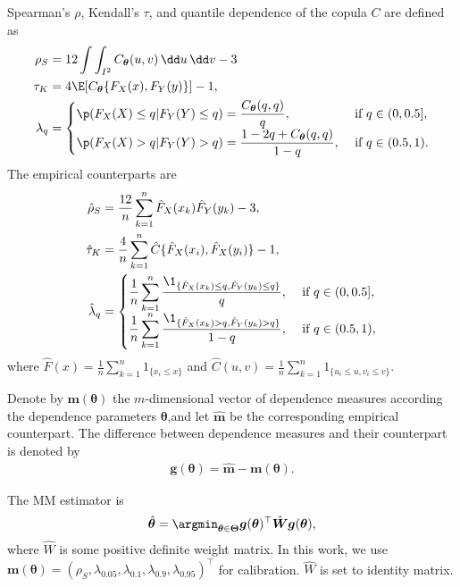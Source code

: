 Spearman's $\rho$, Kendall's $\tau$, and quantile dependence of the copula $C$ are defined as
\begin{align}
  \rho_S &= 12 \int\int_{I^2} C_{\bm{\theta}}(u,v)\, \dd u\, \dd v-3\label{eq:rho_S}\\
  \tau_K &= 4\E[C_{\bm{\theta}}\{F_X(x), F_Y(y)\}]-1,\\
  \lambda_q &=
  \begin{cases}
    \p(F_X(X)\leq q| F_Y(Y)\leq q) = \displaystyle \frac{C_{\bm{\theta}}(q,q)}{q},
    &\text{ if } q\in (0,0.5],\\
    \p(F_X(X)>q|F_Y(Y)>q) =\displaystyle \frac{1-2q+C_{\bm{\theta}}(q,q)} {1-q},
    &\text{ if } q\in (0.5,1).
  \end{cases}
\end{align}\medskip
The empirical counterparts are
\begin{align*}
  \hat\rho_S &= \frac{12}{n} \sum_{k=1}^n \hat F_X(x_k) \hat F_Y(y_k)
               -3,\\
  \hat\tau_K &= \frac{4}{n}\sum_{k=1}^n \hat{C}\{\hat{F}_X(x_i),\hat{F}_X(y_i)\} -1 ,\\
  \hat\lambda_q &=
                  \begin{cases}
                    \displaystyle\frac{1}{n} \sum_{k=1}^n \frac{\1_{\{\hat
                        F_X(x_k)\leq q, \hat F_Y(y_k)\leq q\}}} {q},
                    &\text { if } q\in (0, 0.5],\\
                    \displaystyle \frac{1}{n} \sum_{k=1}^n
                    \frac{\1_{\{\hat F_X(x_k)>q, \hat F_Y(y_k)>q\}}}
                    {1-q}, &\text { if } q\in (0.5,1),
                  \end{cases}
\end{align*}
where $\displaystyle \hat{F}(x) =
  \frac{1}{n}\sum_{k=1}^n 1_{\{x_i\leq x\}}$ and
$\displaystyle \hat{C}(u,v) = \frac{1}{n}\sum_{k=1}^n 1_{\{u_i\leq u, v_i\leq v\}}$. \medskip

Denote by $\bm{m}(\bm{\theta})$ the $m$-dimensional vector of
dependence measures according the dependence parameters
$\bm{\theta}$,and let $\hat{\bm{m}}$ be the corresponding empirical
counterpart. 
The difference between dependence measures and their counterpart is denoted by
\begin{align*}
    \bm{g}(\bm{\theta}) = \hat{\bm{m}} - \bm{m}(\bm{\theta}).
\end{align*}

The MM estimator is
\begin{align*}
    \hat{\bm{\theta}} = \argmin_{\bm{\theta}\in \bm{\Theta}} \bm{g}(\bm{\theta})^\top
    \hat{\bm{W}}
     \bm{g}(\bm{\theta}),
\end{align*}
where $\hat{W}$ is some positive definite weight matrix.
In this work, we use
$\bm{m}(\bm{\theta}) = (\rho_S, \lambda_{0.05}, \lambda_{0.1}, 
\lambda_{0.9}, \lambda_{0.95})^\top$
for calibration.
$\hat{W}$ is set to identity matrix.

